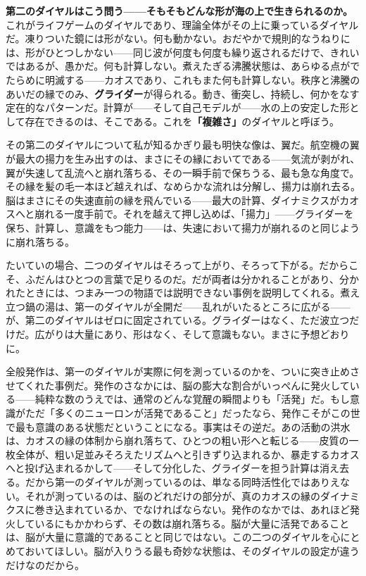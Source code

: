\documentclass[11pt, twoside, openright]{book}
\begin{document}
\textbf{第二のダイヤルはこう問う------そもそもどんな形が海の上で生きられるのか。} これがライフゲームのダイヤルであり、理論全体がその上に乗っているダイヤルだ。凍りついた鏡には形がない。何も動かない。おだやかで規則的なうねりには、形がひとつしかない------同じ波が何度も何度も繰り返されるだけで、きれいではあるが、愚かだ。何も計算しない。煮えたぎる沸騰状態は、あらゆる点がでたらめに明滅する------カオスであり、これもまた何も計算しない。秩序と沸騰のあいだの縁でのみ、\textbf{グライダー}が得られる。動き、衝突し、持続し、何かをなす定在的なパターンだ。計算が------そして自己モデルが------水の上の安定した形として存在できるのは、そこである。これを\textbf{「複雑さ」}のダイヤルと呼ぼう。

その第二のダイヤルについて私が知るかぎり最も明快な像は、翼だ。航空機の翼が最大の揚力を生み出すのは、まさにその縁においてである------気流が剥がれ、翼が失速して乱流へと崩れ落ちる、その一瞬手前で保ちうる、最も急な角度で。その縁を髪の毛一本ほど越えれば、なめらかな流れは分解し、揚力は崩れ去る。脳はまさにその失速直前の縁を飛んでいる------最大の計算、ダイナミクスがカオスへと崩れる一度手前で。それを越えて押し込めば、「揚力」------グライダーを保ち、計算し、意識をもつ能力------は、失速において揚力が崩れるのと同じように崩れ落ちる。

たいていの場合、二つのダイヤルはそろって上がり、そろって下がる。だからこそ、ふだんはひとつの言葉で足りるのだ。だが両者は分かれることがあり、分かれたときには、つまみ一つの物語では説明できない事例を説明してくれる。煮え立つ鍋の湯は、第一のダイヤルが全開だ------乱れがいたるところに広がる------が、第二のダイヤルはゼロに固定されている。グライダーはなく、ただ波立つだけだ。広がりは大量にあり、形はなく、そして意識もない。まさに予想どおりに。

全般発作は、第一のダイヤルが実際に何を測っているのかを、ついに突き止めさせてくれた事例だ。発作のさなかには、脳の膨大な割合がいっぺんに発火している------純粋な数のうえでは、通常のどんな覚醒の瞬間よりも「活発」だ。もし意識がただ「多くのニューロンが活発であること」だったなら、発作こそがこの世で最も意識のある状態だということになる。事実はその逆だ。あの活動の洪水は、カオスの縁の体制から崩れ落ちて、ひとつの粗い形へと転じる------皮質の一枚全体が、粗い足並みそろえたリズムへと引きずり込まれるか、暴走するカオスへと投げ込まれるかして------そして分化した、グライダーを担う計算は消え去る。だから第一のダイヤルが測っているのは、単なる同時活性化ではありえない。それが測っているのは、脳のどれだけの部分が、真のカオスの縁のダイナミクスに巻き込まれているか、でなければならない。発作のなかでは、あれほど発火しているにもかかわらず、その数は崩れ落ちる。脳が大量に活発であることは、脳が大量に意識的であることと同じではない。この二つのダイヤルを心にとめておいてほしい。脳が入りうる最も奇妙な状態は、そのダイヤルの設定が違うだけなのだから。
\end{document}

